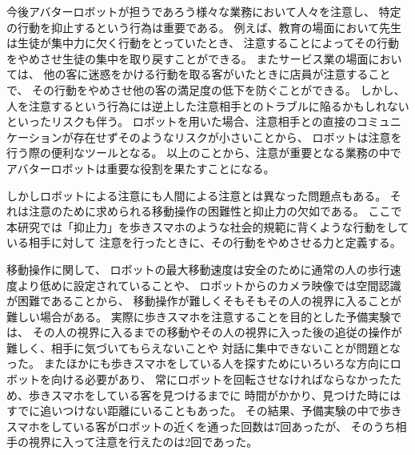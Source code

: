 \documentclass{kuisthesis}
\begin{document}
今後アバターロボットが担うであろう様々な業務において人々を注意し、
特定の行動を抑止するという行為は重要である。
例えば、教育の場面において先生は生徒が集中力に欠く行動をとっていたとき、
注意することによってその行動をやめさせ生徒の集中を取り戻すことができる。
またサービス業の場面においては、
他の客に迷惑をかける行動を取る客がいたときに店員が注意することで、
その行動をやめさせ他の客の満足度の低下を防ぐことができる。
しかし、人を注意するという行為には逆上した注意相手とのトラブルに陥るかもしれないといったリスクも伴う。
ロボットを用いた場合、注意相手との直接のコミュニケーションが存在せずそのようなリスクが小さいことから、
ロボットは注意を行う際の便利なツールとなる。
以上のことから、注意が重要となる業務の中でアバターロボットは重要な役割を果たすことになる。

しかしロボットによる注意にも人間による注意とは異なった問題点もある。
それは注意のために求められる移動操作の困難性と抑止力の欠如である。
ここで本研究では「抑止力」を歩きスマホのような社会的規範に背くような行動をしている相手に対して
注意を行ったときに、その行動をやめさせる力と定義する。

移動操作に関して、
ロボットの最大移動速度は安全のために通常の人の歩行速度より低めに設定されていることや、
ロボットからのカメラ映像では空間認識が困難であることから、
移動操作が難しくそもそもその人の視界に入ることが難しい場合がある。
実際に歩きスマホを注意することを目的とした予備実験では、%
その人の視界に入るまでの移動やその人の視界に入った後の追従の操作が難しく、相手に気づいてもらえないことや
対話に集中できないことが問題となった。
またほかにも歩きスマホをしている人を探すためにいろいろな方向にロボットを向ける必要があり、
常にロボットを回転させなければならなかったため、歩きスマホをしている客を見つけるまでに
時間がかかり、見つけた時にはすでに追いつけない距離にいることもあった。
その結果、予備実験の中で歩きスマホをしている客がロボットの近くを通った回数は7回あったが、
そのうち相手の視界に入って注意を行えたのは2回であった。
\end{document}
